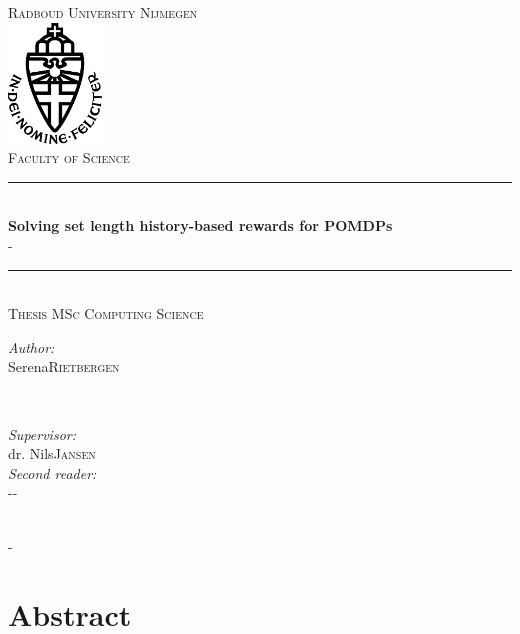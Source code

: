\documentclass[12pt,twoside]{report}
\title{\thesistitle}
\author{\thesisauthorfirst\space\thesisauthorsecond}
\date{\thesisdate}
\def\thesistitle{Solving set length history-based rewards for POMDPs}
\def\thesissubtitle{-}
\def\thesisauthorfirst{Serena}
\def\thesisauthorsecond{Rietbergen}
\def\thesissupervisorfirst{dr. Nils}
\def\thesissupervisorsecond{Jansen}
\def\thesissecondreaderfirst{-}
\def\thesissecondreadersecond{-}
\def\thesisdate{-}
\theoremstyle{definition}
\theoremstyle{remark}
\begin{document}
	\begin{titlepage}
		\thispagestyle{empty}
		\newcommand{\HRule}{\rule{\linewidth}{0.5mm}}
		\center
		\textsc{\Large Radboud University Nijmegen}\\[.7cm]
		\includegraphics[width=25mm]{img/in_dei_nomine_feliciter.eps}\\[.5cm]
		\textsc{Faculty of Science}\\[0.5cm]
		
		\HRule \\[0.4cm]
		{ \huge \bfseries \thesistitle}\\[0.1cm]
		\textsc{\thesissubtitle}\\
		\HRule \\[.5cm]
		\textsc{\large Thesis MSc Computing Science}\\[.5cm]
		
		\begin{minipage}{0.4\textwidth}
			\begin{flushleft} \large
				\emph{Author:}\\
				\thesisauthorfirst\space \textsc{\thesisauthorsecond}
			\end{flushleft}
		\end{minipage}
		~
		\begin{minipage}{0.4\textwidth}
			\begin{flushright} \large
				\emph{Supervisor:} \\
				\thesissupervisorfirst\space \textsc{\thesissupervisorsecond} \\[1em]
				\emph{Second reader:} \\
				\thesissecondreaderfirst\space \textsc{\thesissecondreadersecond}
			\end{flushright}
		\end{minipage}\\[4cm]
		\vfill
		{\large \thesisdate}\\
		\clearpage
	\end{titlepage}
	
	\tableofcontents
	
	\newpage
	
	\chapter*{Abstract}
	
	
\end{document}
